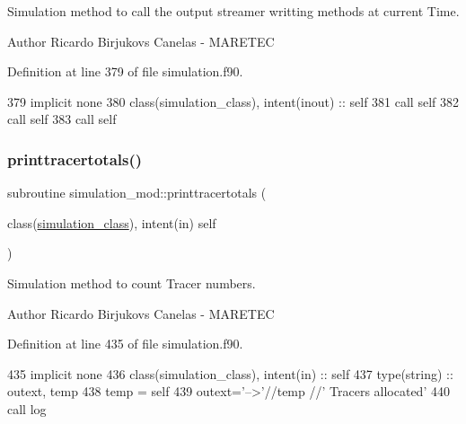 Simulation method to call the output streamer writting methods at current Time. 

\begin{DoxyAuthor}{Author}
Ricardo Birjukovs Canelas -\/ M\+A\+R\+E\+T\+EC 
\end{DoxyAuthor}


Definition at line 379 of file simulation.\+f90.


\begin{DoxyCode}
379     \textcolor{keywordtype}{implicit none}
380     \textcolor{keywordtype}{class}(simulation\_class), \textcolor{keywordtype}{intent(inout)} :: self
381     \textcolor{keyword}{call }self%
382     \textcolor{keyword}{call }self%
383     \textcolor{keyword}{call }self%
\end{DoxyCode}
\mbox{\label{namespacesimulation__mod_aba126a8e0575cabb3bef6ab395002b3c}} 
\subsubsection{\texorpdfstring{printtracertotals()}{printtracertotals()}}
{\footnotesize\ttfamily subroutine simulation\+\_\+mod\+::printtracertotals (\begin{DoxyParamCaption}\item[{class(\mbox{\hyperlink{structsimulation__mod_1_1simulation__class}{simulation\+\_\+class}}), intent(in)}]{self }\end{DoxyParamCaption})\hspace{0.3cm}{\ttfamily [private]}}



Simulation method to count Tracer numbers. 

\begin{DoxyAuthor}{Author}
Ricardo Birjukovs Canelas -\/ M\+A\+R\+E\+T\+EC 
\end{DoxyAuthor}


Definition at line 435 of file simulation.\+f90.


\begin{DoxyCode}
435     \textcolor{keywordtype}{implicit none}
436     \textcolor{keywordtype}{class}(simulation\_class), \textcolor{keywordtype}{intent(in)} :: self
437     \textcolor{keywordtype}{type}(string) :: outext, temp
438     temp = self%
439     outext=\textcolor{stringliteral}{'-->'}//temp //\textcolor{stringliteral}{' Tracers allocated'}
440     \textcolor{keyword}{call }log%
\end{DoxyCode}
\mbox{\label{namespacesimulation__mod_a73bd78c4ac76c51f1e10f5847c25c4df}} 
